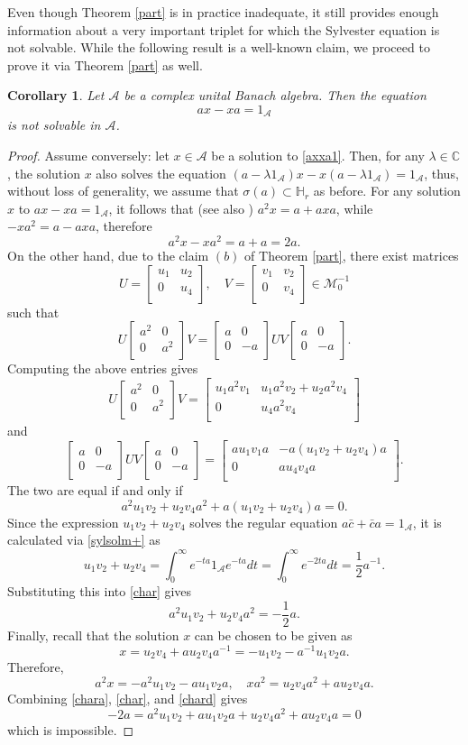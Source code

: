 \documentclass{article}
\newtheorem{corollary}{Corollary}[section]
\theoremstyle{definition}
\def\A{{\mathcal{A}}}
\def\CC{\mathbb{C}}
\def\HR{\mathbb{H}_r}
\newcommand{\mat}[4]{\left[\begin{array}{cc}#1 & #2 \\ #3 & #4 \\
	\end{array}\right]}
\begin{document}
\noindent Even though Theorem \ref{part} is in practice inadequate, it still provides enough information about a very important triplet for which the Sylvester equation is not solvable. While the following result is a well-known claim, we proceed to prove it via Theorem \ref{part} as well.

\begin{corollary} Let $\A$ be a complex unital Banach algebra. Then the equation
\begin{equation}
\label{axxa1}
ax-xa=1_\A
\end{equation}
is not solvable in $\A$. 
\end{corollary}
\begin{proof}
Assume conversely: let $x\in\A$ be a solution to \eqref{axxa1}. Then, for any $\lambda \in\CC$, the solution $x$ also solves the equation $(a-\lambda 1_\A)x-x(a-\lambda 1_{\A})=1_\A$, thus, without loss of generality, we assume that $\sigma(a)\subset\HR$ as before. For any solution $x$ to $ax-xa=1_\A$, it follows that (see also \cite{HC}) $a^2x=a+axa$, while $-xa^2=a-axa$, therefore
\begin{equation}
\label{chara}
a^2x-xa^2=a+a=2a.
\end{equation}
On the other hand, due to the claim $(b)$ of Theorem \ref{part}, there exist matrices 
$$U=\mat{u_1}{u_2}{0}{u_4}, \quad V=\mat{v_1}{v_2}{0}{v_4}\in\mathcal{M}_0^{-1}$$
such that
$$U\mat{a^2}{0}{0}{a^2}V=\mat{a}{0}{0}{-a}UV\mat{a}{0}{0}{-a}.$$
Computing the above entries gives
$$U\mat{a^2}{0}{0}{a^2}V=\mat{u_1 a^2v_1}{u_1a^2v_2+u_2a^2v_4}{0}{u_4a^2v_4}$$
and
$$\mat{a}{0}{0}{-a}UV\mat{a}{0}{0}{-a}=\mat{au_1v_1a}{-a(u_1v_2+u_2v_4)a}{0}{au_4v_4a}.$$
The two are equal if and only if
\begin{equation}\label{char}a^2u_1v_2+u_2v_4a^2+a(u_1v_2+u_2v_4)a=0.\end{equation}
Since the expression $u_1v_2+u_2v_4$ solves the regular equation $a\bar{c}+\bar{c}a=1_\A$, it is calculated via \eqref{sylsolm+} as
$$u_1v_2+u_2v_4=\int_0^\infty e^{-ta}1_\A e^{-ta}dt=\int_0^\infty e^{-2ta}dt=\frac{1}{2}a^{-1}.$$
Substituting this into \eqref{char} gives
\begin{equation}
\label{charb}
a^2u_1v_2+u_2v_4a^2=-\frac{1}{2}a.\end{equation}
Finally, recall that the solution $x$ can be chosen to be given as
\begin{equation}\label{charc}x=u_2v_4+au_2v_4a^{-1}=-u_1v_2-a^{-1}u_1v_2a.\end{equation}
Therefore, 
\begin{equation}
\label{chard}
a^2x=-a^2u_1v_2-au_1v_2a,\quad xa^2=u_2v_4a^2+au_2v_4a.\end{equation}
Combining \eqref{chara}, \eqref{char}, and \eqref{chard} gives
$$-2a=a^2u_1v_2+au_1v_2a+u_2v_4a^2+au_2v_4a=0$$
which is impossible.
\end{proof}
\end{document}

